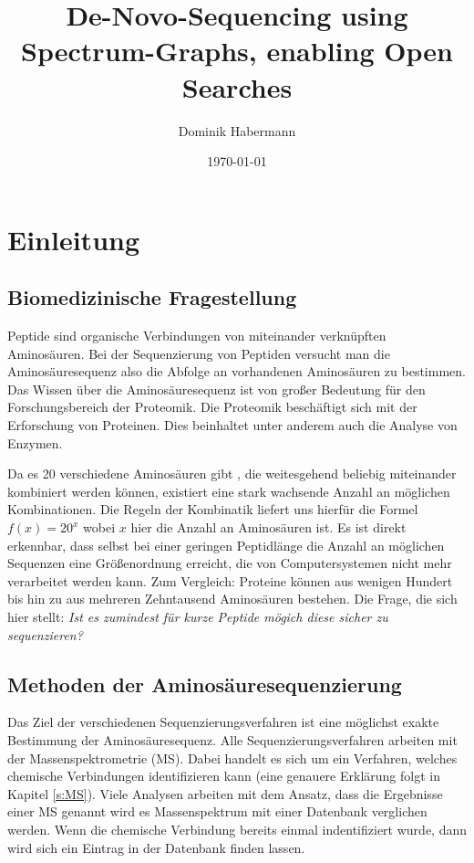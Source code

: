 \documentclass[a4paper, 12pt]{article}
\title{De-Novo-Sequencing using Spectrum-Graphs, enabling Open Searches}
\author{Dominik Habermann}
\date{\today}
\newcommand{\dashAndSpace}{\textendash \space}
\newcommand{\dashAndSpaceSeq}[1]{\dashAndSpace#1 \dashAndSpace}
\begin{document}
\maketitle

\section{Einleitung}\label{s:Einleitung}
\subsection{Biomedizinische Fragestellung}
Peptide sind organische Verbindungen von miteinander verknüpften Aminosäuren. Bei der Sequenzierung von Peptiden versucht man die Aminosäuresequenz \dashAndSpaceSeq{also die Abfolge an vorhandenen Aminosäuren} zu bestimmen. Das Wissen über die Aminosäuresequenz ist von großer Bedeutung für den Forschungsbereich der Proteomik. Die Proteomik beschäftigt sich mit der Erforschung von Proteinen. Dies beinhaltet unter anderem auch die Analyse von Enzymen.

Da es 20 verschiedene Aminosäuren gibt \cite[377]{rudat2021alanins}, die weitesgehend beliebig miteinander kombiniert werden können, existiert eine stark wachsende Anzahl an möglichen Kombinationen. Die Regeln der Kombinatik liefert uns hierfür die Formel $ f(x)=20^x $ wobei $ x $ hier die Anzahl an Aminosäuren ist. Es ist direkt erkennbar, dass selbst bei einer geringen Peptidlänge die Anzahl an möglichen Sequenzen eine Größenordnung erreicht, die von Computersystemen nicht mehr verarbeitet werden kann. Zum Vergleich: Proteine können aus wenigen Hundert bis hin zu aus mehreren Zehntausend Aminosäuren bestehen. Die Frage, die sich hier stellt: \emph{Ist es zumindest für kurze Peptide mögich diese sicher zu sequenzieren?}

\subsection{Methoden der Aminosäuresequenzierung}
Das Ziel der verschiedenen Sequenzierungsverfahren ist eine möglichst exakte Bestimmung der Aminosäuresequenz. Alle Sequenzierungsverfahren arbeiten mit der Massenspektrometrie (MS). Dabei handelt es sich um ein Verfahren, welches chemische Verbindungen identifizieren kann (eine genauere Erklärung folgt in Kapitel \ref{s:MS}). Viele Analysen arbeiten mit dem Ansatz, dass die Ergebnisse einer MS \dashAndSpaceSeq{genannt wird es Massenspektrum} mit einer Datenbank verglichen werden. Wenn die chemische Verbindung bereits einmal indentifiziert wurde, dann wird sich ein Eintrag in der Datenbank finden lassen.
\end{document}

